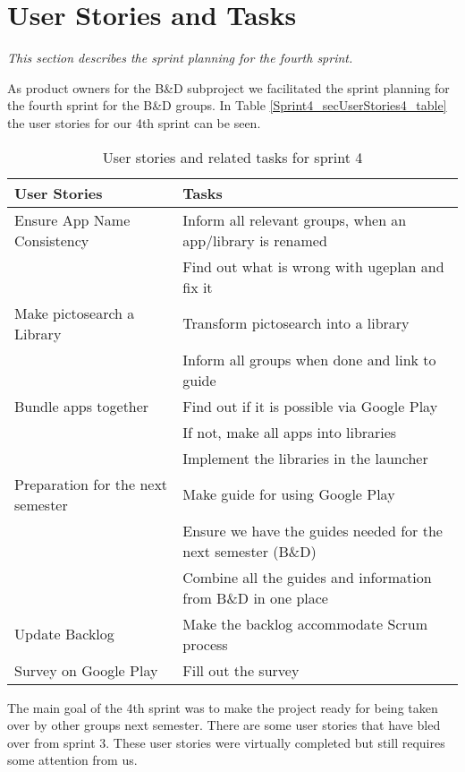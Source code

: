 \section{User Stories and Tasks} \label{Sprint4_SecUserStoriesAndTasks}
\textit{This section describes the sprint planning for the fourth sprint.}

As product owners for the B\&D subproject we facilitated the sprint planning for the fourth sprint for the B\&D groups. In Table \ref{Sprint4_secUserStories4_table} the user stories for our 4th sprint can be seen.

\begin{table}
	\centering
	\begin{tabular}{ll}
		\textbf{User Stories} & \textbf{Tasks}\\ \hline \noalign{\vskip 2mm}
		Ensure App Name Consistency & Inform all relevant groups, when an app/library is renamed\\ 
		& Find out what is wrong with ugeplan and fix it\\ \hline
		Make pictosearch a Library & Transform pictosearch into a library\\
		& Inform all groups when done and link to guide\\ \hline
		Bundle apps together & Find out if it is possible via Google Play\\
		& If not, make all apps into libraries\\
		& Implement the libraries in the launcher\\ \hline
		Preparation for the next semester & Make guide for using Google Play\\
		& Ensure we have the guides needed for the next semester (B\&D)\\
		& Combine all the guides and information from B\&D in one place\\ \hline
		Update Backlog & Make the backlog accommodate Scrum process\\ \hline
		Survey on Google Play & Fill out the survey\\ \hline
	\end{tabular}
	\caption{User stories and related tasks for sprint 4}
	\label{Sprint4_UserStories4_table}
\end{table}

The main goal of the 4th sprint was to make the project ready for being taken over by other groups next semester.
There are some user stories that have bled over from sprint 3. These user stories were virtually completed but still requires some attention from us.\\
